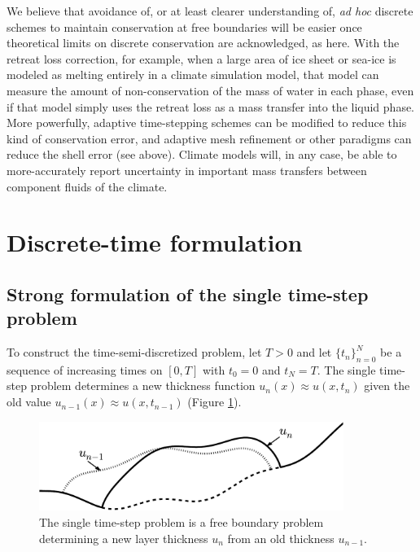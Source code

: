 \documentclass[final,leqno,onefignum,onetabnum]{siamltex1213bueler}
\begin{document}
We believe that avoidance of, or at least clearer understanding of, \emph{ad hoc} discrete schemes to maintain conservation at free boundaries will be easier once theoretical limits on discrete conservation are acknowledged, as here.  With the retreat loss correction, for example, when a large area of ice sheet or sea-ice is modeled as melting entirely in a climate simulation model, that model can measure the amount of non-conservation of the mass of water in each phase, even if that model simply uses the retreat loss as a mass transfer into the liquid phase.  More powerfully, adaptive time-stepping schemes can be modified to reduce this kind of conservation error, and adaptive mesh refinement or other paradigms can reduce the shell error (see above).  Climate models will, in any case, be able to more-accurately report uncertainty in important mass transfers between component fluids of the climate.



\section{Discrete-time formulation}  \label{sec:discreteform}

\subsection{Strong formulation of the single time-step problem}  \label{subsec:strongsingle}  To construct the time-semi-discretized problem, let $T>0$ and let $\{t_n\}_{n=0}^N$ be a sequence of increasing times on $[0,T]$ with $t_0=0$ and $t_N=T$.  The single time-step problem determines a new thickness function $u_n(x) \approx u(x,t_n)$ given the old value $u_{n-1}(x) \approx u(x,t_{n-1})$ (Figure \ref{fig:timestepcartoon}).

\begin{figure}[ht]
\begin{center}
\includegraphics[width=3.9in,keepaspectratio=true]{time-step-cartoon}
\end{center}
\caption{The single time-step problem is a free boundary problem determining a new layer thickness $u_n$ from an old thickness $u_{n-1}$.}
\label{fig:timestepcartoon}
\end{figure}
\end{document}

